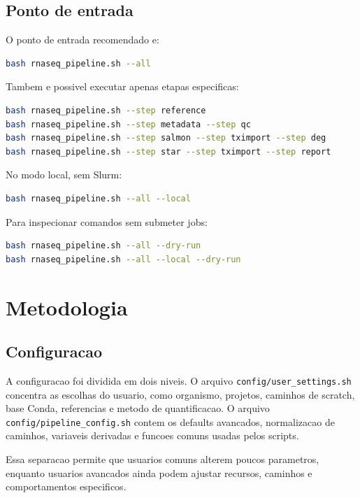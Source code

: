 \documentclass[
  12pt,
  oneside,
  a4paper,
  chapter=TITLE,
  section=TITLE,
  brazil
]{abntex2}
\begin{document}
\section{Ponto de entrada}

O ponto de entrada recomendado e:

\begin{lstlisting}[language=bash]
bash rnaseq_pipeline.sh --all
\end{lstlisting}

Tambem e possivel executar apenas etapas especificas:

\begin{lstlisting}[language=bash]
bash rnaseq_pipeline.sh --step reference
bash rnaseq_pipeline.sh --step metadata --step qc
bash rnaseq_pipeline.sh --step salmon --step tximport --step deg
bash rnaseq_pipeline.sh --step star --step tximport --step report
\end{lstlisting}

No modo local, sem Slurm:

\begin{lstlisting}[language=bash]
bash rnaseq_pipeline.sh --all --local
\end{lstlisting}

Para inspecionar comandos sem submeter jobs:

\begin{lstlisting}[language=bash]
bash rnaseq_pipeline.sh --all --dry-run
bash rnaseq_pipeline.sh --all --local --dry-run
\end{lstlisting}

\chapter{Metodologia}

\section{Configuracao}

A configuracao foi dividida em dois niveis. O arquivo \texttt{config/user\_settings.sh} concentra as escolhas do usuario, como organismo, projetos, caminhos de scratch, base Conda, referencias e metodo de quantificacao. O arquivo \texttt{config/pipeline\_config.sh} contem os defaults avancados, normalizacao de caminhos, variaveis derivadas e funcoes comuns usadas pelos scripts.

Essa separacao permite que usuarios comuns alterem poucos parametros, enquanto usuarios avancados ainda podem ajustar recursos, caminhos e comportamentos especificos.
\end{document}
